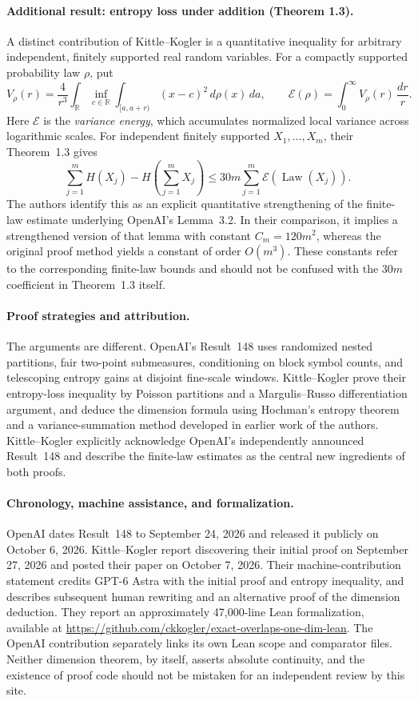 \documentclass[11pt]{article}
\begin{document}
\paragraph{Additional result: entropy loss under addition (Theorem 1.3).}
A distinct contribution of Kittle--Kogler is a quantitative inequality
for arbitrary independent, finitely supported real random variables.
For a compactly supported probability law $\rho$, put
\[
 V_\rho(r)=\frac{4}{r^3}\int_{\mathbb R}
   \inf_{c\in\mathbb R}\int_{[a,a+r)}(x-c)^2\,d\rho(x)\,da,
 \qquad
 \mathcal E(\rho)=\int_0^\infty V_\rho(r)\,\frac{dr}{r}.
\]
Here $\mathcal E$ is the \emph{variance energy}, which accumulates
normalized local variance across logarithmic scales. For independent
finitely supported $X_1,\ldots,X_m$, their Theorem~1.3 gives
\[
 \boxed{
 \sum_{j=1}^m H(X_j)
 -H\!\left(\sum_{j=1}^m X_j\right)
 \leq 30m\sum_{j=1}^m\mathcal E(\operatorname{Law}(X_j)).
 }
\]
The authors identify this as an explicit quantitative strengthening of
the finite-law estimate underlying OpenAI's Lemma~3.2. In their
comparison, it implies a strengthened version of that lemma with
constant $C_m=120m^2$, whereas the original proof method yields a
constant of order $O(m^3)$. These constants refer to the corresponding
finite-law bounds and should not be confused with the $30m$ coefficient
in Theorem~1.3 itself.

\paragraph{Proof strategies and attribution.}
The arguments are different. OpenAI's Result~148 uses randomized
nested partitions, fair two-point submeasures, conditioning on block
symbol counts, and telescoping entropy gains at disjoint fine-scale
windows. Kittle--Kogler prove their entropy-loss inequality by Poisson
partitions and a Margulis--Russo differentiation argument, and deduce
the dimension formula using Hochman's entropy theorem and a
variance-summation method developed in earlier work of the authors.
Kittle--Kogler explicitly acknowledge OpenAI's independently announced
Result~148 and describe the finite-law estimates as the central new
ingredients of both proofs.

\paragraph{Chronology, machine assistance, and formalization.}
OpenAI dates Result~148 to September 24, 2026 and released it publicly
on October 6, 2026. Kittle--Kogler report discovering their initial
proof on September 27, 2026 and posted their paper on October 7, 2026.
Their machine-contribution statement credits GPT-6 Astra with the
initial proof and entropy inequality, and describes subsequent human
rewriting and an alternative proof of the dimension deduction.
They report an approximately 47,000-line Lean formalization, available
at \url{https://github.com/ckkogler/exact-overlaps-one-dim-lean}.
The OpenAI contribution separately links its own Lean scope and
comparator files. Neither dimension theorem, by itself, asserts
absolute continuity, and the existence of proof code should not be
mistaken for an independent review by this site.
\end{document}
